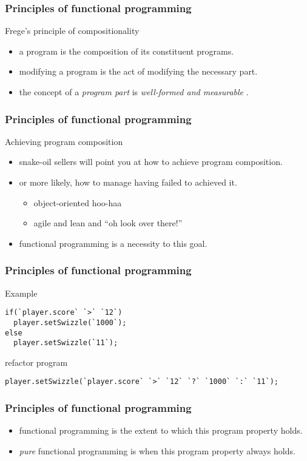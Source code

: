 \begin{frame}
\frametitle{Principles of functional programming}
\begin{block}{Frege's principle of compositionality \cite{janssen2001frege}}
\begin{itemize}
\item<1-> a program is the composition of its constituent programs.
\item<2-> modifying a program is the act of modifying the necessary part.
\item<3-> the concept of a \emph{program part} is \emph{well-formed and measurable} \cite{hughes1989functional}.
\end{itemize}
\end{block}
\end{frame}

\begin{frame}
\frametitle{Principles of functional programming}
\begin{block}{Achieving program composition}
\begin{itemize}
\item<1-> snake-oil sellers will point you at how to achieve program composition.
\item<2-> or more likely, how to manage having failed to achieved it.
          \begin{itemize}
          \item \tiny{object-oriented hoo-haa}
          \item \tiny{agile and lean and ``oh look over there!''}
          \end{itemize}
\item<3-> functional programming is a necessity to this goal.
\end{itemize}
\end{block}
\end{frame}

\begin{frame}[fragile]
\frametitle{Principles of functional programming}
\begin{block}{Example}
\begin{lstlisting}[style=java,mathescape,basicstyle=\scriptsize]
if(`player.score` `>` `12`)
  player.setSwizzle(`1000`);
else
  player.setSwizzle(`11`);
\end{lstlisting}
\end{block}
\begin{block}{refactor program}
\begin{lstlisting}[style=java,mathescape,basicstyle=\scriptsize]
player.setSwizzle(`player.score` `>` `12` `?` `1000` `:` `11`);
\end{lstlisting}
\end{block}
\end{frame}

\begin{frame}
\frametitle{Principles of functional programming}
\begin{itemize}
\item<1-> functional programming is the extent to which this program property holds.
\item<2-> \emph{pure} functional programming is when this program property always holds.
\end{itemize}
\end{frame}

